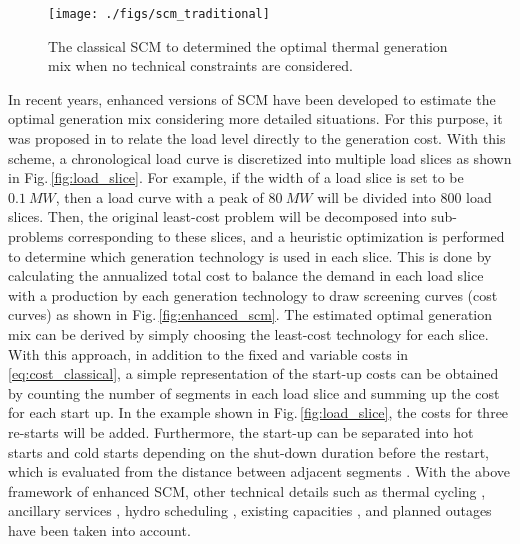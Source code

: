 \documentclass[lettersize,journal]{IEEEtran}
\newcommand{\figref}[1]{Fig.\,\ref{#1}}
\begin{document}
\begin{figure}[!t]
 \centering
 \texttt{[image: ./figs/scm\_traditional]}
 \caption{The classical SCM to determined the optimal thermal generation mix when no technical constraints are considered. } \label{fig:classical_scm}
\end{figure}


%
In recent years, enhanced versions of SCM have been developed to estimate the optimal generation mix considering more detailed situations.
For this purpose, it was proposed in \cite{batlle13} to relate the load level directly to the generation cost. 
With this scheme, a chronological load curve is discretized into multiple load slices as shown in \figref{fig:load_slice}. 
For example, if the width of a load slice is set to be $\SI{0.1}{MW}$, then a load curve with a peak of $\SI{80}{MW}$ will be divided into $800$ load slices.
Then, the original least-cost problem will be decomposed into sub-problems corresponding to these slices, and a heuristic optimization is performed to determine which generation technology is used in each slice. 
This is done by calculating the annualized total cost to balance the demand in each load slice with a production by each generation technology to draw screening curves (cost curves) as shown in \figref{fig:enhanced_scm}. 
The estimated optimal generation mix can be derived by simply choosing the least-cost technology for each slice. 
With this approach, in addition to the fixed and variable costs in \eqref{eq:cost_classical}, a simple representation of the start-up costs can be obtained by counting the number of segments in each load slice and summing up the cost for each start up.  
In the example shown in \figref{fig:load_slice}, the costs for three re-starts will be added. 
Furthermore, the start-up can be separated into hot starts and cold starts depending on the shut-down duration before the restart, which is evaluated from the distance between adjacent segments \cite{batlle13,zhang15}. 
With the above framework of enhanced SCM, other technical details such as thermal cycling \cite{zhang15}, ancillary services \cite{zhang15:ancillary}, 
hydro scheduling \cite{staffell16}, existing capacities \cite{zhang17,guner18}, and planned outages \cite{zhang19} have been taken into account.
\end{document}
